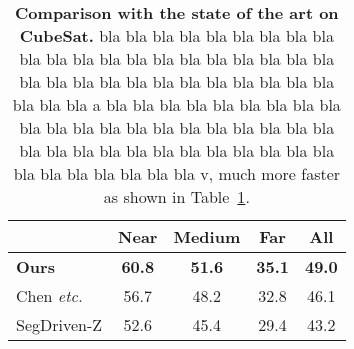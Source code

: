  

\begin{table}
    \centering
    \begin{small}
    \begin{tabular}{lcccc}
        \toprule
        &	Near & Medium & Far & All\\
        \midrule
        {\bf Ours} & {\bf 60.8} & {\bf 51.6} & {\bf 35.1} & {\bf 49.0} \\
        Chen {\it etc.} & 56.7 & 48.2 & 32.8 & 46.1 \\
        SegDriven-Z & 52.6 & 45.4 & 29.4 & 43.2 \\ 
        \bottomrule
    \end{tabular}
    \end{small}
    \vspace{-3mm}
    \caption{{\bf Comparison with the state of the art on CubeSat.} bla bla bla bla bla bla bla bla bla bla bla bla bla bla bla bla bla bla bla bla bla bla bla bla bla bla bla bla bla bla bla bla bla bla bla bla a bla bla bla bla bla bla bla bla bla bla bla bla bla bla bla bla bla bla bla bla bla bla bla bla bla bla bla bla bla bla bla bla bla bla bla bla bla bla bla bla v, much more faster as shown in Table~\ref{tab:swisscube_stoa}.}
    \label{tab:swisscube_stoa}
\end{table} 